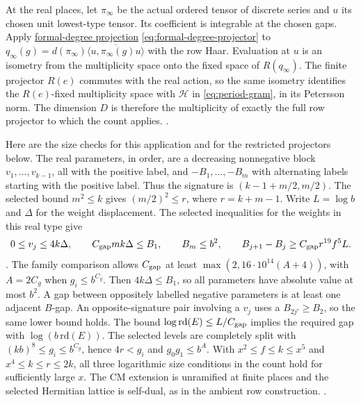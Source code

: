 At the real places, let \(\pi_\infty\) be the actual ordered tensor
of discrete series and \(u\) its chosen unit lowest-type tensor.
Its coefficient is integrable at the chosen gaps. Apply
\hyperlink{proof.bessel-real-projector}{formal-degree projection}
\eqref{eq:formal-degree-projector} to
\(q_\infty(g)=d(\pi_\infty)\overline{\langle u,\pi_\infty(g)u\rangle}\)
with the row Haar. Evaluation at \(u\) is an isometry from the
multiplicity space onto the fixed space of \(R(q_\infty)\).
The finite projector \(R(e)\) commutes with the real action, so the
same isometry identifies the \(R(e)\)-fixed multiplicity space
with \(\mathcal H\) in \eqref{eq:period-gram}, in its Petersson norm.
The dimension \(D\) is therefore the multiplicity of exactly
the full row projector to which the count applies.
.

Here are the size checks for this application and for the restricted
projectors below. The real parameters, in order, are a decreasing
nonnegative block \(v_1,\ldots,v_{k-1}\), all with the positive label,
and \(-B_1,\ldots,-B_m\) with alternating labels starting with the
positive label. Thus the signature is
\((k-1+m/2,m/2)\). The selected bound \(m^2\le k\)
gives \((m/2)^2\le r\), where \(r=k+m-1\).
Write \(L=\log b\) and \(\Delta\) for the weight displacement.
The selected inequalities for the weights in this real type give
\[
  0\le v_j\le4k\Delta,\qquad
  C_{\rm gap}mk\Delta\le B_1,\qquad
  B_m\le b^2,\qquad
  B_{j+1}-B_j\ge C_{\rm gap}r^{19}f^5 L .
\]
.
The family comparison allows \(C_{\rm gap}\) at least
\(\max(2,16\cdot10^{14}(A+4))\), with \(A=2C_g\) when \(g_i\le b^{C_g}\).
Then \(4k\Delta\le B_1\), so all parameters have absolute value
at most \(b^2\). A gap between oppositely labelled negative parameters
is at least one adjacent \(B\)-gap. An opposite-signature pair
involving a \(v_j\) uses a \(B_{2j'}\ge B_2\), so the same lower
bound holds. The bound \(\log\mathrm{rd}(E)\le L/C_{\rm gap}\)
implies the required gap with \(\log(b\,\mathrm{rd}(E))\).
The selected levels are completely split with
\((kb)^8\le g_i\le b^{C_g}\), hence \(4r<g_i\) and
\(g_0g_1\le b^A\). With \(x^2\le f\le k\le x^5\)
and \(x^4\le k\le r\le2k\), all three logarithmic size conditions in
the count hold for sufficiently large \(x\). The CM extension
is unramified at finite places and the selected Hermitian lattice
is self-dual, as in the ambient row construction.
.

